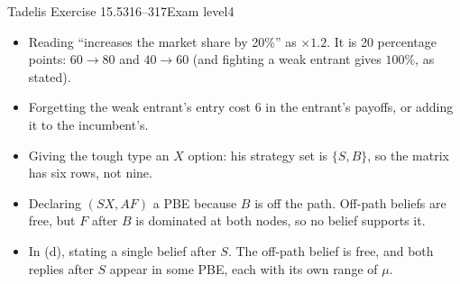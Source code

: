 \begin{exsol}{Tadelis Exercise 15.5}{316--317}{Exam level}{4}
\mistakes
\begin{itemize}
  \item Reading ``increases the market share by 20\%'' as $\times 1.2$. It is 20 percentage points: $60 \to 80$ and
  $40 \to 60$ (and fighting a weak entrant gives $100\%$, as stated).
  \item Forgetting the weak entrant's entry cost $6$ in the entrant's payoffs, or adding it to the incumbent's.
  \item Giving the tough type an $X$ option: his strategy set is $\{S, B\}$, so the matrix has six rows, not nine.
  \item Declaring $(SX, AF)$ a PBE because $B$ is off the path. Off-path beliefs are free, but $F$ after $B$ is
  dominated at both nodes, so no belief supports it.
  \item In (d), stating a single belief after $S$. The off-path belief is free, and both replies after $S$ appear
  in some PBE, each with its own range of $\mu$.
\end{itemize}

\end{exsol}
